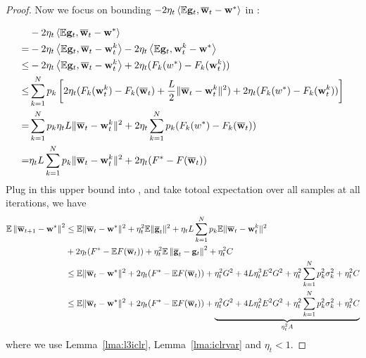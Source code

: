 \begin{proof}
Now we focus on bounding $-2 \eta_{t} \left< \mathbb{E} {\mathbf{g}}_{t}, {\overline{\mathbf{w}}}_{t}-{\mathbf{w}}^{*}\right>$ in \eq{\ref{eq:expandsgd}}: 

\begin{align*}
	& -2 \eta_{t} \left<\mathbb{E} {\mathbf{g}}_{t}, {\overline{\mathbf{w}}}_{t}-{\mathbf{w}}^{*}\right> \\
 =  & -2 \eta_{t} \left<\mathbb{E} {\mathbf{g}}_{t}, {\overline{\mathbf{w}}}_{t}- {\mathbf{w}}^{k}_t \right> -2 \eta_{t} \left<\mathbb{E} {\mathbf{g}}_{t}, {\mathbf{w}}^{k}_t - {\mathbf{w}}^{*}\right>\\
 \leq & -2 \eta_{t} \left<\mathbb{E} {\mathbf{g}}_{t}, {\overline{\mathbf{w}}}_{t}- {\mathbf{w}}^{k}_t \right> + 2 \eta_{t} (F_k(w^*) - F_k({\mathbf{w}}^{k}_t))\\
 \leq &\sum_{k=1}^N p_k \left[2 \eta_{t} (F_k({\mathbf{w}}^{k}_t) - F_k({\overline{\mathbf{w}}}_t) + \frac{L}{2} \|{\overline{\mathbf{w}}}_t - {\mathbf{w}}^{k}_t\|^2 ) + 2 \eta_{t} (F_k(w^*) - F_k({\mathbf{w}}^{k}_t))\right]\\
 = & \sum_{k=1}^N p_k \eta_t L \|{\overline{\mathbf{w}}}_t - {\mathbf{w}}^{k}_t\|^2 + 2 \eta_{t} \sum_{k=1}^N p_k (F_k(w^*) - F_k({\overline{\mathbf{w}}}_t))\\
 = &  \eta_t L \sum_{k=1}^N p_k \|{\overline{\mathbf{w}}}_t - {\mathbf{w}}^{k}_t\|^2 + 2 \eta_{t} (F^* - F({\overline{\mathbf{w}}}_t))
\end{align*}
Plug in this upper bound into \eq{\ref{eq:expandsgd}}, \eq{\ref{eq:sgdcvxsmth1}} and take totoal expectation over all samples at all iterations, we have
\begin{align}
\mathbb{E}\left\|{\overline{\mathbf{w}}}_{t+1}-{\mathbf{w}}^{*}\right\|^2 &\leq \mathbb{E}\|{\overline{\mathbf{w}}}_{t}-{\mathbf{w}}^{*}\|^{2}+\eta_{t}^{2} \mathbb{E}\| {\overline{\mathbf{g}}}_{t} \|^{2} + \eta_t L \sum_{k=1}^N p_k \mathbb{E} \|{\overline{\mathbf{w}}}_t - {\mathbf{w}}^{k}_t\|^2 \nonumber \\
& + 2 \eta_{t} (F^* - \mathbb{E} F({\overline{\mathbf{w}}}_t)) + \eta_{t}^2\mathbb{E}\left\| {\overline{\mathbf{g}}}_t -  {\mathbf{g}}_{t}\right\|^2+ \eta_t^2 C\\
&\leq \mathbb{E}\|{\overline{\mathbf{w}}}_{t}-{\mathbf{w}}^{*}\|^{2} + 2 \eta_{t} (F^* - \mathbb{E} F({\overline{\mathbf{w}}}_t)) + \eta_{t}^{2} G^2 +4 L \eta_{t}^{3}E^{2} G^{2} + \eta_{t}^{2}\sum_{k=1}^{N} p_{k}^{2}\sigma_k^2 + \eta_t^2 C\\
&\leq \mathbb{E}\|{\overline{\mathbf{w}}}_{t}-{\mathbf{w}}^{*}\|^{2} + 2 \eta_{t} (F^* - \mathbb{E} F({\overline{\mathbf{w}}}_t)) + \underbrace{\eta_{t}^{2} G^2 +4 L \eta_{t}^{2}E^{2} G^{2} + \eta_{t}^{2}\sum_{k=1}^{N} p_{k}^{2}\sigma_k^2 + \eta_t^2 C}_{\eta_t^2 A}
\label{eq:cvxsgd1}
\end{align}
where we use Lemma~\ref{lma:l3iclr}, Lemma~\ref{lma:iclrvar} and $\eta_t < 1$.


\end{proof}
